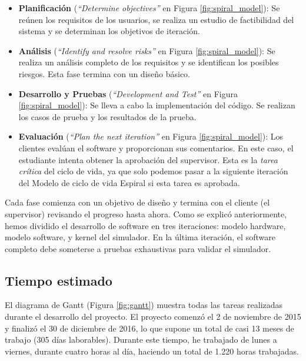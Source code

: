 \begin{itemize}
\item \textbf{Planificación} (\emph{``Determine objectives''} en Figura \ref{fig:spiral_model}): Se reúnen los requisitos de los usuarios, se realiza un estudio de factibilidad del sistema y se determinan los objetivos de iteración.

\item \textbf{Análisis} (\emph{``Identify and resolve risks''} en Figura \ref{fig:spiral_model}): Se realiza un análisis completo de los requisitos y se identifican los posibles riesgos. Esta fase termina con un diseño básico.

\item \textbf{Desarrollo y Pruebas} (\emph{``Development and Test''} en Figura \ref{fig:spiral_model}): Se lleva a cabo la implementación del código. Se realizan los casos de prueba y los resultados de la prueba.

\item \textbf{Evaluación} (\emph{``Plan the next iteration''} en Figura \ref{fig:spiral_model}): 
Los clientes evalúan el \gls{software} y proporcionan sus comentarios. En este caso, el estudiante intenta obtener la aprobación del supervisor. Esta es la \textit{tarea crítica} del ciclo de vida, ya que solo podemos pasar a la siguiente iteración del Modelo de ciclo de vida Espiral si esta tarea es aprobada.

\end{itemize}

Cada fase comienza con un objetivo de diseño y termina con el cliente (el supervisor) revisando el progreso hasta ahora. Como se explicó anteriormente, hemos dividido el desarrollo de \gls{software} en tres iteraciones: modelo \gls{hardware}, modelo \gls{software}, y kernel del simulador. En la última iteración, el \gls{software} completo debe someterse a pruebas exhaustivas para validar el simulador.

\subsection{Tiempo estimado}

El diagrama de Gantt (Figura \ref{fig:gantt}) muestra todas las tareas realizadas durante el desarrollo del proyecto. El proyecto comenzó el 2 de noviembre de 2015 y finalizó el 30 de diciembre de 2016, lo que supone un total de casi 13 meses de trabajo (305 días laborables). Durante este tiempo, he trabajado de lunes a viernes, durante cuatro horas al día, haciendo un total de 1.220 horas trabajadas.

